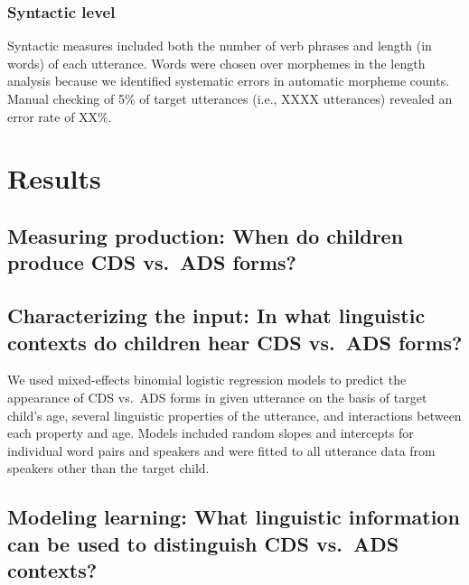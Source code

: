 \documentclass[10pt, letterpaper]{article}
\begin{document}
\hypertarget{syntactic-level}{%
\subsubsection{Syntactic level}\label{syntactic-level}}

Syntactic measures included both the number of verb phrases and length
(in words) of each utterance. Words were chosen over morphemes in the
length analysis because we identified systematic errors in automatic
morpheme counts. Manual checking of 5\% of target utterances (i.e., XXXX
utterances) revealed an error rate of XX\%.

\hypertarget{results}{%
\section{Results}\label{results}}

\hypertarget{measuring-production-when-do-children-produce-cds-vs.-ads-forms}{%
\subsection{Measuring production: When do children produce CDS vs.~ADS
forms?}\label{measuring-production-when-do-children-produce-cds-vs.-ads-forms}}

\hypertarget{characterizing-the-input-in-what-linguistic-contexts-do-children-hear-cds-vs.-ads-forms}{%
\subsection{Characterizing the input: In what linguistic contexts do
children hear CDS vs.~ADS
forms?}\label{characterizing-the-input-in-what-linguistic-contexts-do-children-hear-cds-vs.-ads-forms}}

We used mixed-effects binomial logistic regression models to predict the
appearance of CDS vs.~ADS forms in given utterance on the basis of
target child's age, several linguistic properties of the utterance, and
interactions between each property and age. Models included random
slopes and intercepts for individual word pairs and speakers and were
fitted to all utterance data from speakers other than the target child.

\hypertarget{modeling-learning-what-linguistic-information-can-be-used-to-distinguish-cds-vs.-ads-contexts}{%
\subsection{Modeling learning: What linguistic information can be used
to distinguish CDS vs.~ADS
contexts?}\label{modeling-learning-what-linguistic-information-can-be-used-to-distinguish-cds-vs.-ads-contexts}}
\end{document}
